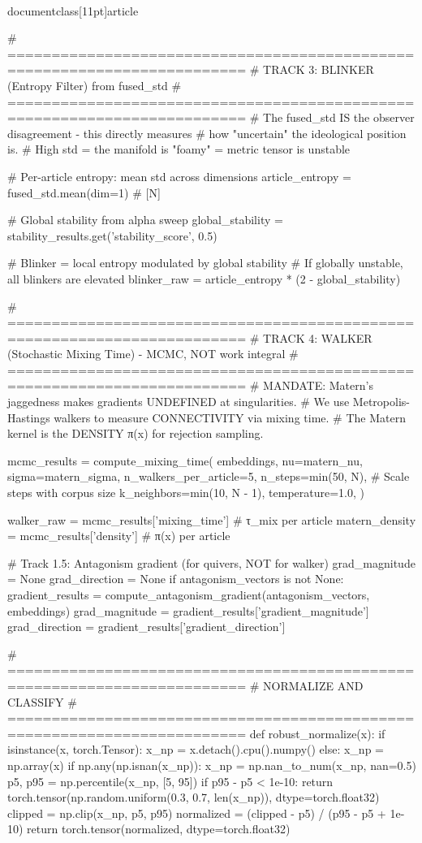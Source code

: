 \\documentclass[11pt]{article}
\begin{document}
\begin{CodeBlock}
    # =========================================================================
    # TRACK 3: BLINKER (Entropy Filter) from fused_std
    # =========================================================================
    # The fused_std IS the observer disagreement - this directly measures
    # how "uncertain" the ideological position is.
    # High std = the manifold is "foamy" = metric tensor is unstable

    # Per-article entropy: mean std across dimensions
    article_entropy = fused_std.mean(dim=1)  # [N]

    # Global stability from alpha sweep
    global_stability = stability_results.get('stability_score', 0.5)

    # Blinker = local entropy modulated by global stability
    # If globally unstable, all blinkers are elevated
    blinker_raw = article_entropy * (2 - global_stability)

    # =========================================================================
    # TRACK 4: WALKER (Stochastic Mixing Time) - MCMC, NOT work integral
    # =========================================================================
    # MANDATE: Matern's jaggedness makes gradients UNDEFINED at singularities.
    # We use Metropolis-Hastings walkers to measure CONNECTIVITY via mixing time.
    # The Matern kernel is the DENSITY π(x) for rejection sampling.

    mcmc_results = compute_mixing_time(
        embeddings,
        nu=matern_nu,
        sigma=matern_sigma,
        n_walkers_per_article=5,
        n_steps=min(50, N),  # Scale steps with corpus size
        k_neighbors=min(10, N - 1),
        temperature=1.0,
    )

    walker_raw = mcmc_results['mixing_time']  # τ_mix per article
    matern_density = mcmc_results['density']  # π(x) per article

    # Track 1.5: Antagonism gradient (for quivers, NOT for walker)
    grad_magnitude = None
    grad_direction = None
    if antagonism_vectors is not None:
        gradient_results = compute_antagonism_gradient(antagonism_vectors, embeddings)
        grad_magnitude = gradient_results['gradient_magnitude']
        grad_direction = gradient_results['gradient_direction']

    # =========================================================================
    # NORMALIZE AND CLASSIFY
    # =========================================================================
    def robust_normalize(x):
        if isinstance(x, torch.Tensor):
            x_np = x.detach().cpu().numpy()
        else:
            x_np = np.array(x)
        if np.any(np.isnan(x_np)):
            x_np = np.nan_to_num(x_np, nan=0.5)
        p5, p95 = np.percentile(x_np, [5, 95])
        if p95 - p5 < 1e-10:
            return torch.tensor(np.random.uniform(0.3, 0.7, len(x_np)), dtype=torch.float32)
        clipped = np.clip(x_np, p5, p95)
        normalized = (clipped - p5) / (p95 - p5 + 1e-10)
        return torch.tensor(normalized, dtype=torch.float32)


\end{CodeBlock}
\end{document}
